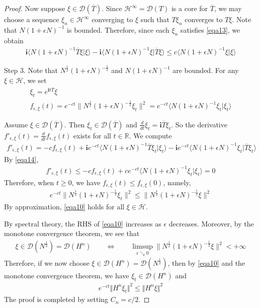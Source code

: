\documentclass[12pt,b5paper,notitlepage]{article}
\theoremstyle{definition}
\theoremstyle{plain}
\newcommand{\mc}{\mathcal}
\newcommand{\ovl}{\overline}
\newcommand{\Dom}{\scr{D}}
\newcommand{\bk}[1]{\langle {#1}\rangle}
\newcommand{\scr}{\mathscr}
\newcommand{\im}{\mathbf{i}}
\newcommand{\Rbb}{\mathbb R}
\numberwithin{equation}{section}
\begin{document}
\begin{proof}
Now suppose $\xi\in\Dom(\ovl T)$. Since $\mc H^\infty=\Dom(T)$ is a core for $\ovl T$, we may choose a sequence $\xi_n\in\mc H^\infty$ converging to $\xi$ such that $T\xi_n$ converges to $T\xi$. Note that $N(1+\epsilon N)^{-1}$ is bounded. Therefore, since each $\xi_n$ satisfies \eqref{eqa13}, we obtain
\begin{align*}
\im\bk{N(1+\epsilon N)^{-1}\ovl T\xi|\xi}-\im\bk{N(1+\epsilon N)^{-1}\xi|\ovl T\xi}	\leq 	c\bk{N(1+\epsilon N)^{-1}\xi|\xi}\tag{c}\label{eqa14}
\end{align*}


Step 3. Note that $N^{\frac 12}(1+\epsilon N)^{-\frac 12}$ and $N(1+\epsilon N)^{-1}$ are  bounded. For any $\xi\in\mc H$, we set
\begin{gather*}
\xi_t=e^{\im t\ovl T}\xi\\
f_{\epsilon,\xi}(t)=	e^{-ct}\big\lVert{N^{\frac 12}(1+\epsilon N)^{-\frac 12}\xi_t}\big\lVert^2=e^{-ct}\bk{N(1+\epsilon N)^{-1}\xi_t|\xi_t}
\end{gather*}


Assume $\xi\in\Dom(\ovl T)$. Then $\xi_t\in\Dom(\ovl T)$ and $\frac d{dt}\xi_t=\im\ovl T\xi_t$. So the derivative $f'_{\epsilon,\xi}(t)=\frac d{dt}f_{\epsilon,\xi}(t)$ exists for all $t\in\Rbb$.  We compute
\begin{align*}
f'_{\epsilon,\xi}(t)=-cf_{\epsilon,\xi}(t)+\im e^{-ct}\bk{N(1+\epsilon N)^{-1}\ovl T\xi_t|\xi_t}-\im e^{-ct}\bk{N(1+\epsilon N)^{-1}\xi_t|\ovl T\xi_t}\tag{d}\label{eqa9}
\end{align*}
By \eqref{eqa14},
\begin{align*}
f'_{\epsilon,\xi}(t)\leq-cf_{\epsilon,\xi}(t)+ce^{-ct}\bk{N(1+\epsilon N)^{-1}\xi_t|\xi_t}=0
\end{align*}
Therefore, when $t\geq 0$, we have $f_{\epsilon,\xi}(t)\leq f_{\epsilon,\xi}(0)$, namely,
\begin{align}
e^{-ct}\big\lVert{N^{\frac 12}(1+\epsilon N)^{-\frac 12}\xi_t}\big\lVert^2\leq \big\lVert{N^{\frac 12}(1+\epsilon N)^{-\frac 12}\xi}\big\lVert^2\tag{e}\label{eqa10}
\end{align}
By approximation, \eqref{eqa10} holds for all $\xi\in\mc H$.

By spectral theory, the RHS of \eqref{eqa10} increases as $\epsilon$ decreases. Moreover, by the monotone convergence theorem, we see that
\begin{align*}
\xi\in\Dom(N^{\frac12})=\Dom(H^n)\qquad\Longleftrightarrow\qquad\limsup_{\epsilon\searrow0}\big\lVert{N^{\frac 12}(1+\epsilon N)^{-\frac 12}\xi}\big\lVert^2<+\infty
\end{align*}
Therefore, if we now choose $\xi\in\Dom(H^n)=\Dom(N^{\frac 12})$, then by \eqref{eqa10} and the monotone convergence theorem, we have $\xi_t\in\Dom(H^n)$ and 
\begin{align*}
e^{-ct}\Vert H^n\xi_t\Vert^2\leq \Vert H^n\xi\Vert^2
\end{align*}
The proof is completed by setting $C_n=c/2$.
\end{proof}
\end{document}
